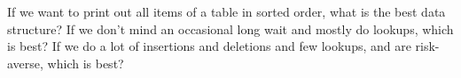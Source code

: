 \begin{Boxample}[6]
If we want to print out all items of a table in sorted order, what is the best data structure?
If we don't mind an occasional long wait and mostly do lookups, which is best?
If we do a lot of insertions and deletions and few lookups, and are risk-averse, which is best?
\end{Boxample}









